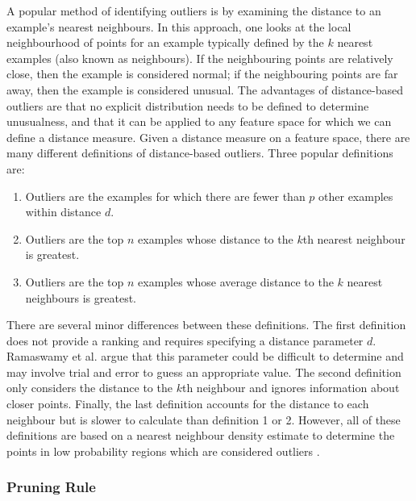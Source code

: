 A popular method of identifying outliers is by examining the distance to an example’s nearest neighbours. In this approach, one looks at the local neighbourhood of points for an example typically defined by the $k$ nearest examples (also known as neighbours). If the neighbouring points are relatively close, then the example is considered normal; if the neighbouring points are far away, then the example is considered unusual. The advantages of distance-based outliers are that no explicit distribution needs to be defined to determine unusualness, and that it can be applied to any feature space for which we can define a distance measure. Given a distance measure on a feature space, there are many different definitions of distance-based outliers. Three popular definitions are:
\begin{enumerate}
\item Outliers are the examples for which there are fewer than $p$ other examples within distance $d$.
\item Outliers are the top $n$ examples whose distance to the $k$th nearest neighbour is greatest.
\item Outliers are the top $n$ examples whose average distance to the $k$ nearest neighbours is greatest.
\end{enumerate}
\cite{Bay:2003}

There are several minor differences between these definitions. The first definition does not provide a ranking and requires specifying a distance parameter $d$. Ramaswamy et al. argue that this parameter could be difficult to determine and may involve trial and error to guess an appropriate value. The second definition only considers the distance to the $k$th neighbour and ignores information about closer points. Finally, the last definition accounts for the distance to each neighbour but is slower to calculate than definition 1 or 2. However, all of these definitions are based on a nearest neighbour density estimate to determine the points in low probability regions which are considered outliers \cite{Bay:2003}.

\subsubsection{Pruning Rule}
\label{anomalyDetection:approaches:distance:pruning}

